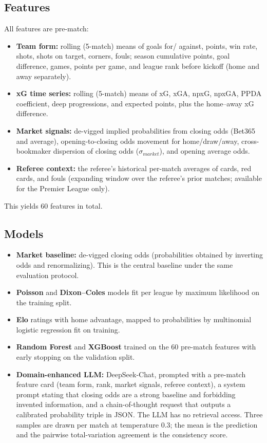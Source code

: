\subsection{Features}
All features are pre-match:
\begin{itemize}
\item \textbf{Team form:} rolling (5-match) means of goals for/
against, points, win rate, shots, shots on target, corners, fouls;
season cumulative points, goal difference, games, points per game,
and league rank before kickoff (home and away separately).
\item \textbf{xG time series:} rolling (5-match) means of xG, xGA,
npxG, npxGA, PPDA coefficient, deep progressions, and expected
points, plus the home--away xG difference.
\item \textbf{Market signals:} de-vigged implied probabilities from
closing odds (Bet365 and average), opening-to-closing odds movement
for home/draw/away, cross-bookmaker dispersion of closing odds
($\sigma_{market}$), and opening average odds.
\item \textbf{Referee context:} the referee's historical per-match
averages of cards, red cards, and fouls (expanding window over the
referee's prior matches; available for the Premier League only).
\end{itemize}
This yields 60 features in total.

\subsection{Models}
\begin{itemize}
\item \textbf{Market baseline:} de-vigged closing odds
(probabilities obtained by inverting odds and renormalizing). This
is the central baseline under the same evaluation protocol.
\item \textbf{Poisson} and \textbf{Dixon--Coles} models fit per
league by maximum likelihood on the training split.
\item \textbf{Elo} ratings with home advantage, mapped to
probabilities by multinomial logistic regression fit on training.
\item \textbf{Random Forest} and \textbf{XGBoost} trained on the 60
pre-match features with early stopping on the validation split.
\item \textbf{Domain-enhanced LLM:} DeepSeek-Chat, prompted with a
pre-match feature card (team form, rank, market signals, referee
context), a system prompt stating that closing odds are a strong
baseline and forbidding invented information, and a chain-of-thought
request that outputs a calibrated probability triple in JSON. The
LLM has no retrieval access. Three samples are drawn per match at
temperature 0.3; the mean is the prediction and the pairwise
total-variation agreement is the consistency score.
\end{itemize}

